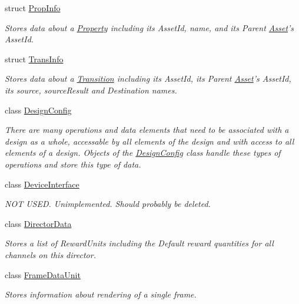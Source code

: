 \begin{DoxyCompactItemize}
struct \hyperlink{struct_picto_1_1_prop_info}{Prop\-Info}
\begin{DoxyCompactList}\small\item\em Stores data about a \hyperlink{class_picto_1_1_property}{Property} including its Asset\-Id, name, and its Parent \hyperlink{class_picto_1_1_asset}{Asset}'s Asset\-Id. \end{DoxyCompactList}\item 
struct \hyperlink{struct_picto_1_1_trans_info}{Trans\-Info}
\begin{DoxyCompactList}\small\item\em Stores data about a \hyperlink{class_picto_1_1_transition}{Transition} including its Asset\-Id, its Parent \hyperlink{class_picto_1_1_asset}{Asset}'s Asset\-Id, its source, source\-Result and Destination names. \end{DoxyCompactList}\item 
class \hyperlink{class_picto_1_1_design_config}{Design\-Config}
\begin{DoxyCompactList}\small\item\em There are many operations and data elements that need to be associated with a design as a whole, accessable by all elements of the design and with access to all elements of a design. Objects of the \hyperlink{class_picto_1_1_design_config}{Design\-Config} class handle these types of operations and store this type of data. \end{DoxyCompactList}\item 
class \hyperlink{class_picto_1_1_device_interface}{Device\-Interface}
\begin{DoxyCompactList}\small\item\em N\-O\-T U\-S\-E\-D. Unimplemented. Should probably be deleted. \end{DoxyCompactList}\item 
class \hyperlink{class_picto_1_1_director_data}{Director\-Data}
\begin{DoxyCompactList}\small\item\em Stores a list of Reward\-Units including the Default reward quantities for all channels on this director. \end{DoxyCompactList}\item 
class \hyperlink{class_picto_1_1_frame_data_unit}{Frame\-Data\-Unit}
\begin{DoxyCompactList}\small\item\em Stores information about rendering of a single frame. \end{DoxyCompactList}\item 

\end{DoxyCompactItemize}
